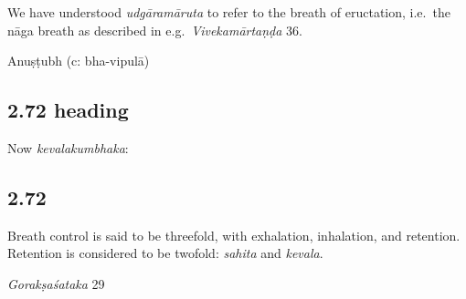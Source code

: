 \begin{ekdosis}
\begin{philcomm}[hp02_071]
We have understood \emph{udgāramāruta} to refer to the breath of eructation, i.e.~the nāga breath as described in e.g.~\emph{Vivekamārtaṇḍa} 36.\lb


\end{philcomm}

\begin{metre}[hp02_071]
Anuṣṭubh (c: bha-vipulā)
\end{metre}


\subsection*{2.72 heading}
\begin{translation}[hp02_072a]
Now \emph{kevalakumbhaka}:
\end{translation}


\subsection*{2.72}
\begin{translation}[hp02_072]

Breath control is said to be threefold, with exhalation, inhalation, and retention. Retention is considered to be twofold: \emph{sahita} and \emph{kevala}.

\end{translation}

\begin{sources}[hp02_072]
\emph{Gorakṣaśataka} 29


\end{sources}
\end{ekdosis}
